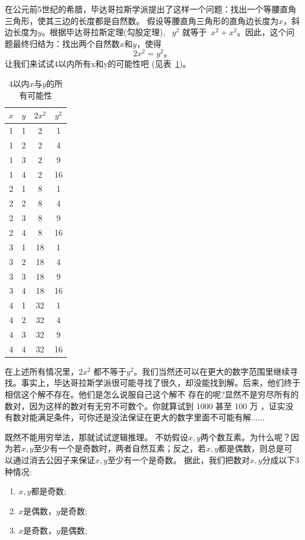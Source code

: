 在公元前5世纪的希腊，毕达哥拉斯学派提出了这样一个问题：找出一个等腰直角三角形，使其三边的长度都是自然数。
假设等腰直角三角形的直角边长度为$x$，斜边长度为$y$。根据毕达哥拉斯定理(勾股定理), ~$y^2$ 就等于~$x^2+x^2$。因此，这个问题最终归结为：找出两个自然数$x$和$y$，使得
\begin{equation}\label{eqn}
2x^2=y^2。
\end{equation}
让我们来试试4以内所有x和y的可能性吧 (见表~\ref{tab:example})。
\begin{table}[htbp]
\centering
\caption{4以内$x$与$y$的所有可能性}
\begin{tabular}{|c|c|c|c|}
\hline
$x$ & $y$ & $2x^2$ & $y^2$ \\
\hline
1 & 1 & 2 & 1 \\
\hline
1 & 2 & 2 & 4 \\
\hline
1 & 3 & 2 & 9 \\
\hline
1 & 4 & 2 & 16 \\
\hline
2 & 1 & 8 & 1 \\
\hline
2 & 2 & 8 & 4 \\
\hline
2 & 3 & 8 & 9 \\
\hline
2 & 4 & 8 & 16 \\
\hline
3 & 1 & 18 & 1 \\
\hline
3 & 2 & 18 & 4 \\
\hline
3 & 3 & 18 & 9 \\
\hline
3 & 4 & 18 & 16 \\
\hline
4 & 1 & 32 & 1 \\
\hline
4 & 2 & 32 & 4 \\
\hline
4 & 3 & 32 & 9 \\
\hline
4 & 4 & 32 & 16 \\
\hline
\end{tabular}
\label{tab:example}
\end{table}
在上述所有情况里，$2x^2$ 都不等于$y^2$。我们当然还可以在更大的数字范围里继续寻找。事实上，毕达哥拉斯学派很可能寻找了很久，却没能找到解。后来，他们终于相信这个解不存在。他们是怎么说服自己这个解不 存在的呢?显然不是穷尽所有的数对，因为这样的数对有无穷不可数个。你就算试到 1000 甚至 100 万 ，证实没有数对能满足条件，可你还是没法保证在更大的数字里面不可能有解......

既然不能用穷举法，那就试试逻辑推理。 
不妨假设$x,y$两个数互素。为什么呢？因为若$x,y$至少有一个是奇数时，两者自然互素；反之，若$x,y$都是偶数，则总是可以通过消去公因子来保证$x,y$至少有一个是奇数。
据此，我们把数对$x,y$分成以下3种情况: 
\begin{enumerate}
\item $x,y$都是奇数;
\item $x$是偶数，$y$是奇数;
\item $x$是奇数，$y$是偶数;
\end{enumerate}

